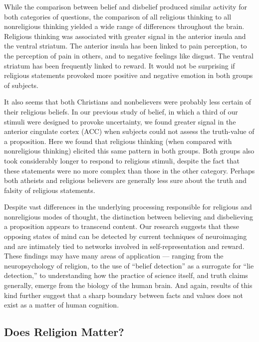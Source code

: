 \documentclass[a4paper,14pt]{extarticle}
\begin{document}
While the comparison between belief and disbelief produced similar activity for both categories of questions, the comparison of all religious thinking to all nonreligious thinking yielded a wide range of differences throughout the brain.
Religious thinking was associated with greater signal in the anterior insula and the ventral striatum.
The anterior insula has been linked to pain perception, to the perception of pain in others, and to negative feelings like disgust.
The ventral striatum has been frequently linked to reward.
It would not be surprising if religious statements provoked more positive and negative emotion in both groups of subjects.

It also seems that both Christians and nonbelievers were probably less certain of their religious beliefs.
In our previous study of belief, in which a third of our stimuli were designed to provoke uncertainty, we found greater signal in the anterior cingulate cortex (ACC) when subjects could not assess the truth-value of a proposition.
Here we found that religious thinking (when compared with nonreligious thinking) elicited this same pattern in both groups.
Both groups also took considerably longer to respond to religious stimuli, despite the fact that these statements were no more complex than those in the other category.
Perhaps both atheists and religious believers are generally less sure about the truth and falsity of religious statements.

Despite vast differences in the underlying processing responsible for religious and nonreligious modes of thought, the distinction between believing and disbelieving a proposition appears to transcend content.
Our research suggests that these opposing states of mind can be detected by current techniques of neuroimaging and are intimately tied to networks involved in self-representation and reward.
These findings may have many areas of application --- ranging from the neuropsychology of religion, to the use of ``belief detection'' as a surrogate for ``lie detection,'' to understanding how the practice of science itself, and truth claims generally, emerge from the biology of the human brain.
And again, results of this kind further suggest that a sharp boundary between facts and values does not exist as a matter of human cognition.

\subsection{Does Religion Matter?}
\end{document}
